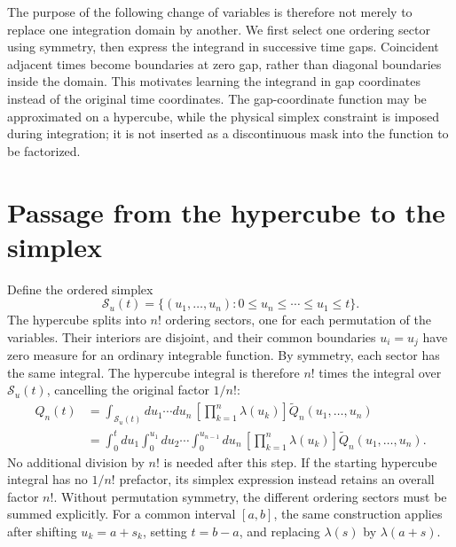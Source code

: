 \documentclass[11pt]{article}
\begin{document}
The purpose of the following change of variables is therefore not merely
to replace one integration domain by another. We first select one
ordering sector using symmetry, then express the integrand in successive
time gaps. Coincident adjacent times become boundaries at zero gap,
rather than diagonal boundaries inside the domain. This motivates
learning the integrand in gap coordinates instead of the original time
coordinates. The gap-coordinate function may be approximated on a
hypercube, while the physical simplex constraint is imposed during
integration; it is not inserted as a discontinuous mask into the function
to be factorized.

\section{Passage from the hypercube to the simplex}

Define the ordered simplex
\begin{equation}
    \mathcal S_u(t)=\{(u_1,\ldots,u_n):
        0\leq u_n\leq\cdots\leq u_1\leq t\}.
    \label{eq:ordered_simplex}
\end{equation}
The hypercube splits into ${n!}$ ordering sectors, one for each permutation
of the variables. Their interiors are disjoint, and their common
boundaries $u_i=u_j$ have zero measure for an ordinary integrable function.
By symmetry, each sector has the same integral. The hypercube integral
is therefore ${n!}$ times the integral over $\mathcal S_u(t)$, cancelling
the original factor $1/{n!}$:
\begin{equation}
    \boxed{\begin{aligned}
    Q_n(t)&=\int_{\mathcal S_u(t)}du_1\cdots du_n\,
        \left[\prod_{k=1}^n\lambda(u_k)\right]
        \widetilde Q_n(u_1,\ldots,u_n)\\
    &=\int_0^t du_1\int_0^{u_1}du_2\cdots
      \int_0^{u_{n-1}}du_n\,
      \left[\prod_{k=1}^n\lambda(u_k)\right]
      \widetilde Q_n(u_1,\ldots,u_n).
    \end{aligned}}
    \label{eq:ordered_integral}
\end{equation}
No additional division by ${n!}$ is needed after this step.
If the starting hypercube integral has no $1/{n!}$ prefactor, its simplex
expression instead retains an overall factor ${n!}$. Without permutation
symmetry, the different ordering sectors must be summed explicitly.
For a common interval $[a,b]$, the same construction applies after
shifting $u_k=a+s_k$, setting $t=b-a$, and replacing $\lambda(s)$
by $\lambda(a+s)$.
\end{document}

